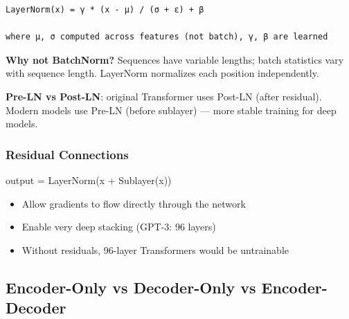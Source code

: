 \documentclass[11pt]{article}
\providecommand{\tightlist}{\setlength{\itemsep}{1pt}\setlength{\parskip}{0pt}}
\newenvironment{Shaded}{\begin{snugshade}}{\end{snugshade}}
\newcommand{\NormalTok}[1]{\textcolor[rgb]{0.81,0.81,0.76}{#1}}
\newcommand{\OperatorTok}[1]{\textcolor[rgb]{0.81,0.81,0.76}{#1}}
\begin{document}
\setcodelang{}

\begin{verbatim}
LayerNorm(x) = γ * (x - μ) / (σ + ε) + β

where μ, σ computed across features (not batch), γ, β are learned
\end{verbatim}

\textbf{Why not BatchNorm?} Sequences have variable lengths; batch statistics vary with sequence length. LayerNorm normalizes each position independently.

\textbf{Pre-LN vs Post-LN}: original Transformer uses Post-LN (after residual). Modern models use Pre-LN (before sublayer) --- more stable training for deep models.

\subsubsection{Residual Connections}\label{residual-connections}


\begin{Shaded}
\begin{Highlighting}[]
\NormalTok{output }\OperatorTok{=}\NormalTok{ LayerNorm(x }\OperatorTok{+}\NormalTok{ Sublayer(x))}
\end{Highlighting}
\end{Shaded}

\begin{itemize}
\tightlist
\item
  Allow gradients to flow directly through the network
\item
  Enable very deep stacking (GPT-3: 96 layers)
\item
  Without residuals, 96-layer Transformers would be untrainable
\end{itemize}

\subsection{Encoder-Only vs Decoder-Only vs Encoder-Decoder}\label{encoder-only-vs-decoder-only-vs-encoder-decoder}
\end{document}
